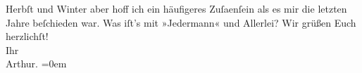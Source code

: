 \begin{ledgroupsized}[t]{13cm}
                  Herbſt und Winter aber hoff ich ein häufigeres Zuſa{\geminationm}enſein als es mir die letzten Jahre beſchieden war. Was
               iſt’s mit »Jedermann« und Allerlei? \pend
           \pstart
           Wir grüßen Euch herzlichſt!{\\[\baselineskip]}Ihr{\\[\baselineskip]}\spacefill\mbox{Arthur.}\pend
           \leftskip=0em{}
         
         \endnumbering{}\end{ledgroupsized}  \newcommand{\dateiname}{L02041}\newcommand{\titel}{Arthur Schnitzler an Hugo von Hofmannsthal, 22. 10. 1911}\newcommand{\editorInnen}{Martin Anton Müller und Gerd-Hermann Susen}
      